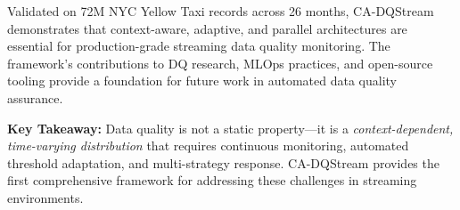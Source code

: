 Validated on 72M NYC Yellow Taxi records across 26 months, CA-DQStream demonstrates that context-aware, adaptive, and parallel architectures are essential for production-grade streaming data quality monitoring. The framework's contributions to DQ research, MLOps practices, and open-source tooling provide a foundation for future work in automated data quality assurance.

\textbf{Key Takeaway:} Data quality is not a static property---it is a \emph{context-dependent, time-varying distribution} that requires continuous monitoring, automated threshold adaptation, and multi-strategy response. CA-DQStream provides the first comprehensive framework for addressing these challenges in streaming environments.
